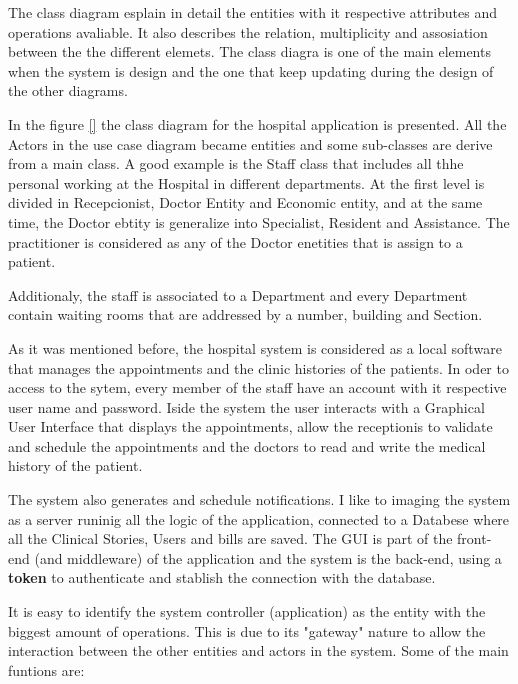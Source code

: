 \documentclass{article}
\begin{document}
            The class diagram esplain in detail the entities with it respective attributes and operations avaliable. It also describes the relation, multiplicity and
            assosiation between the the different elemets. The class diagra is one of the main elements when the system is design and the one that keep updating during the 
            design of the other diagrams.

            In the figure \ref{} the class diagram for the hospital application is presented. All the Actors in the use case diagram became entities and some sub-classes are derive from a main class.
            A good example is the Staff class that includes all thhe personal working at the Hospital in different departments. At the first level is divided in Recepcionist, Doctor Entity and Economic entity, and at the same time,
            the Doctor ebtity is generalize into Specialist, Resident and Assistance. The practitioner is considered as any of the Doctor enetities that is assign to a patient.

            Additionaly, the staff is associated to a Department and every Department contain waiting rooms that are addressed by a number, building and Section.

            As it was mentioned before, the hospital system is considered as a local software that manages the appointments and the clinic histories of the patients. In oder to access to the sytem, every member of the staff have an account with
            it respective user name and password. Iside the system the user interacts with a Graphical User Interface that displays the appointments, allow the receptionis to validate and schedule the appointments and the doctors to read and write the
            medical history of the patient. 

            The system also generates and schedule notifications. I like to imaging the system as a server runinig all the logic of the application, connected to a Databese where all the Clinical Stories, Users and bills are saved.
            The GUI is part of the front-end (and middleware) of the application and the system is the back-end, using a \textbf{token} to authenticate and stablish the connection with the database.
            
            It is easy to identify the system controller (application) as the entity with the biggest amount of operations. This is due to its "gateway" nature to allow the  interaction between the other entities and actors in the system.
            Some of the main funtions are:
\end{document}
